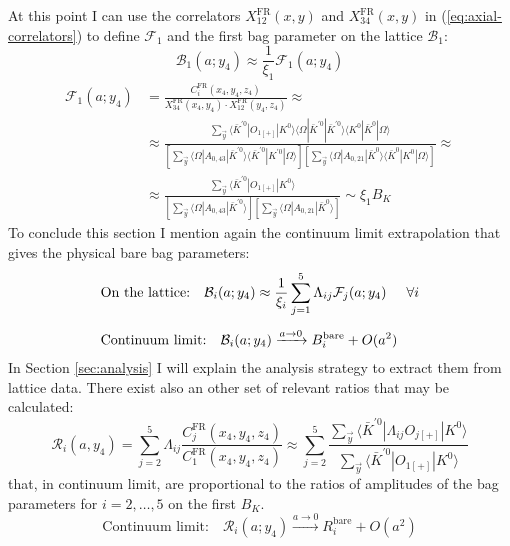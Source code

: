 \documentclass[english, LaM, oneside, noexaminfo]{sapthesis}
\newcommand{\la}{\langle}
\newcommand{\ra}{\rangle}
\newcommand{\bare}{^{\text{bare}}}
\begin{document}
At this point I can use the correlators $X_{12}^\text{FR}(x,y)$ and $X_{34}^\text{FR}(x,y)$ in (\ref{eq:axial-correlators}) to define $\mathcal{F}_1$ and the first bag parameter on the lattice $\mathcal{B}_1$:
\begin{equation}\label{eq:bag-1-extraction}
    \mathcal{B}_1 (a;y_4) \approx \frac{1}{\xi_1} \mathcal{F}_1 (a;y_4)
\end{equation}
\begin{equation*}
    \begin{split}
        \mathcal{F}_1 (a;y_4) & =  \frac{C_i^\text{FR}(x_4,y_4,z_4)}{X_{34}^\text{FR}(x_4,y_4) \cdot X_{12}^\text{FR}(y_4,z_4)} \approx \\
        & \approx \frac{\sum_{\vec y} \la \bar K^{'0} | O_{1[+]} | K^0 \ra  \la \Omega | \bar K^{'0} | \bar K^{'0} \ra  \la K^0 | \bar K^0 | \Omega \ra}{\left[ \sum_{\vec{y}} \la \Omega | A_{0,43} | \bar K^{'0} \ra \la \bar K^{'0} | K^{'0} | \Omega \ra  \right] \left[ \sum_{\vec y} \la \Omega | A_{0,21} | \bar K^{0} \ra \la \bar K^{0} | K^{0} | \Omega \ra \right]} \approx \\
        & \approx \frac{\sum_{\vec y} \la \bar K^{'0} | O_{1[+]} | K^0 \ra }{\left[ \sum_{\vec{y}} \la \Omega | A_{0,43} | \bar K^{'0} \ra \right] \left[ \sum_{\vec y} \la \Omega | A_{0,21} | \bar K^{0} \ra \right]} \sim \xi_1 B_K
    \end{split}
\end{equation*}
To conclude this section I mention again the continuum limit extrapolation that gives the physical bare bag parameters:
\begin{equation}\label{eq:bag-parameters-extraction}
    \begin{split}
        & \text{On the lattice:} \quad \mathcal{B}_i (a;y_4) \approx \frac{1}{\xi_i}\sum_{j=1}^5 \Lambda_{ij} \mathcal{F}_j (a; y_4) \hspace*{5mm} \forall i \\[5pt]
        & \text{Continuum limit:} \quad \mathcal{B}_i (a;y_4) \xrightarrow{a \rightarrow 0} B_i\bare + O(a^2)
    \end{split}
\end{equation}
In Section \ref{sec:analysis} I will explain the analysis strategy to extract them from lattice data.
\newline
There exist also an other set of relevant ratios that may be calculated:
\begin{equation*}
    \mathcal{R}_i (a,y_4) = \sum_{j=2}^5 \Lambda_{ij} \frac{ C_j^\text{FR}(x_4,y_4,z_4) }{C_1^\text{FR}(x_4,y_4,z_4)} \approx \sum_{j=2}^5 \frac{\sum_{\vec{y}} \la \bar K^{'0} | \Lambda_{ij} O_{j[+]} | K^0 \ra}{\sum_{\vec{y}} \la \bar K^{'0} | O_{1[+]} | K^0 \ra}
\end{equation*}
that, in continuum limit, are proportional to the ratios of amplitudes of the bag parameters for $i=2,\dots,5$ on the first $B_K$.
\begin{equation*}
    \text{Continuum limit:} \quad \mathcal{R}_i (a;y_4) \xrightarrow{a \rightarrow 0} R_i\bare + O(a^2)
\end{equation*}
\end{document}
